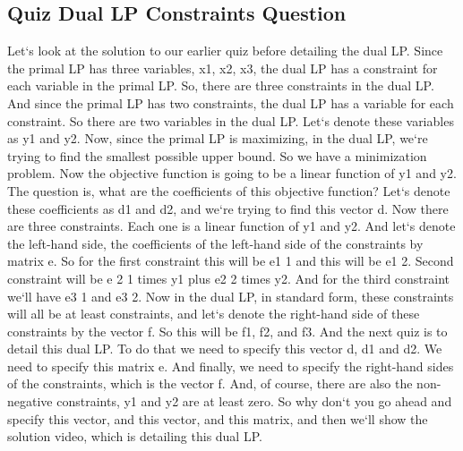 \subsection{Quiz  Dual LP Constraints Question}
Let`s look at the solution to our earlier quiz before detailing the dual LP\@.
Since the primal LP has three variables, x1, x2, x3, the dual LP has a constraint for each variable in the primal LP\@.
So, there are three constraints in the dual LP\@.
And since the primal LP has two constraints, the dual LP has a variable for each constraint.
So there are two variables in the dual LP\@.
Let`s denote these variables as y1 and y2.
Now, since the primal LP is maximizing, in the dual LP, we`re trying to find the smallest possible upper bound.
So we have a minimization problem.
Now the objective function is going to be a linear function of y1 and y2.
The question is, what are the coefficients of this objective function? Let`s denote these coefficients as d1 and d2, and we`re trying to find this vector d.
Now there are three constraints.
Each one is a linear function of y1 and y2.
And let`s denote the left-hand side, the coefficients of the left-hand side of the constraints by matrix e.
So for the first constraint this will be e1 1 and this will be e1 2.
Second constraint will be e 2 1 times y1 plus e2 2 times y2.
And for the third constraint we`ll have e3 1 and e3 2.
Now in the dual LP, in standard form, these constraints will all be at least constraints, and let`s denote the right-hand side of these constraints by the vector f.
So this will be f1, f2, and f3.
And the next quiz is to detail this dual LP\@.
To do that we need to specify this vector d, d1 and d2.
We need to specify this matrix e.
And finally, we need to specify the right-hand sides of the constraints, which is the vector f.
And, of course, there are also the non-negative constraints, y1 and y2 are at least zero.
So why don`t you go ahead and specify this vector, and this vector, and this matrix, and then we`ll show the solution video, which is detailing this dual LP\@.


